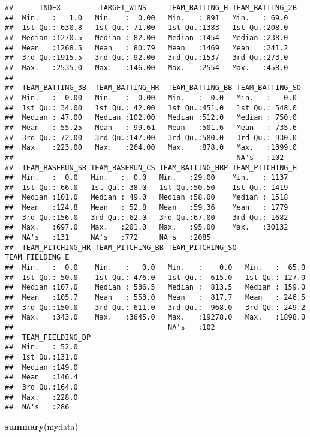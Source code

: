 \documentclass[
]{article}
\newenvironment{Shaded}{\begin{snugshade}}{\end{snugshade}}
\newcommand{\KeywordTok}[1]{\textcolor[rgb]{0.13,0.29,0.53}{\textbf{#1}}}
\newcommand{\NormalTok}[1]{#1}
\begin{document}
\begin{verbatim}
##      INDEX         TARGET_WINS     TEAM_BATTING_H TEAM_BATTING_2B
##  Min.   :   1.0   Min.   :  0.00   Min.   : 891   Min.   : 69.0  
##  1st Qu.: 630.8   1st Qu.: 71.00   1st Qu.:1383   1st Qu.:208.0  
##  Median :1270.5   Median : 82.00   Median :1454   Median :238.0  
##  Mean   :1268.5   Mean   : 80.79   Mean   :1469   Mean   :241.2  
##  3rd Qu.:1915.5   3rd Qu.: 92.00   3rd Qu.:1537   3rd Qu.:273.0  
##  Max.   :2535.0   Max.   :146.00   Max.   :2554   Max.   :458.0  
##                                                                  
##  TEAM_BATTING_3B  TEAM_BATTING_HR  TEAM_BATTING_BB TEAM_BATTING_SO 
##  Min.   :  0.00   Min.   :  0.00   Min.   :  0.0   Min.   :   0.0  
##  1st Qu.: 34.00   1st Qu.: 42.00   1st Qu.:451.0   1st Qu.: 548.0  
##  Median : 47.00   Median :102.00   Median :512.0   Median : 750.0  
##  Mean   : 55.25   Mean   : 99.61   Mean   :501.6   Mean   : 735.6  
##  3rd Qu.: 72.00   3rd Qu.:147.00   3rd Qu.:580.0   3rd Qu.: 930.0  
##  Max.   :223.00   Max.   :264.00   Max.   :878.0   Max.   :1399.0  
##                                                    NA's   :102     
##  TEAM_BASERUN_SB TEAM_BASERUN_CS TEAM_BATTING_HBP TEAM_PITCHING_H
##  Min.   :  0.0   Min.   :  0.0   Min.   :29.00    Min.   : 1137  
##  1st Qu.: 66.0   1st Qu.: 38.0   1st Qu.:50.50    1st Qu.: 1419  
##  Median :101.0   Median : 49.0   Median :58.00    Median : 1518  
##  Mean   :124.8   Mean   : 52.8   Mean   :59.36    Mean   : 1779  
##  3rd Qu.:156.0   3rd Qu.: 62.0   3rd Qu.:67.00    3rd Qu.: 1682  
##  Max.   :697.0   Max.   :201.0   Max.   :95.00    Max.   :30132  
##  NA's   :131     NA's   :772     NA's   :2085                    
##  TEAM_PITCHING_HR TEAM_PITCHING_BB TEAM_PITCHING_SO  TEAM_FIELDING_E 
##  Min.   :  0.0    Min.   :   0.0   Min.   :    0.0   Min.   :  65.0  
##  1st Qu.: 50.0    1st Qu.: 476.0   1st Qu.:  615.0   1st Qu.: 127.0  
##  Median :107.0    Median : 536.5   Median :  813.5   Median : 159.0  
##  Mean   :105.7    Mean   : 553.0   Mean   :  817.7   Mean   : 246.5  
##  3rd Qu.:150.0    3rd Qu.: 611.0   3rd Qu.:  968.0   3rd Qu.: 249.2  
##  Max.   :343.0    Max.   :3645.0   Max.   :19278.0   Max.   :1898.0  
##                                    NA's   :102                       
##  TEAM_FIELDING_DP
##  Min.   : 52.0   
##  1st Qu.:131.0   
##  Median :149.0   
##  Mean   :146.4   
##  3rd Qu.:164.0   
##  Max.   :228.0   
##  NA's   :286
\end{verbatim}

\begin{Shaded}
\begin{Highlighting}[]
\KeywordTok{summary}\NormalTok{(mydata)}
\end{Highlighting}
\end{Shaded}
\end{document}
